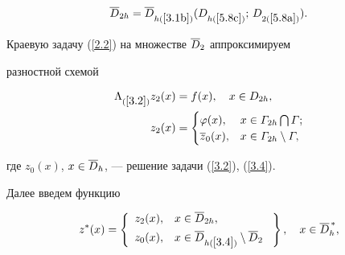 \begin{equation} \label{5.8d}


\Db_{2h}=\Db_{h(\ref{3.1b})}(D_{h(\ref{5.8c})}; \,


D_{2(\ref{5.8a})}).


\end{equation}





Краевую задачу (\ref{2.2}) на множестве $\overline{D}_2$ аппроксимируем


разностной схемой


\begin{equation} \label{5.8e}


\begin{split}


\La_{(\ref{3.2})} z_2(x) &= f(x), \quad 


x\in D_{2h}, \\


z_2(x)&=


\begin{cases}


\vf(x), & x\in \G_{2h}\bigcap \G;\\


\ovl{z}_0(x), & x\in \G_{2h}\setminus \G,


\end{cases}


\end{split}


\end{equation}


где $z_0(x)$, $x\in\overline{D}_h$, --- решение задачи (\ref{3.2}), (\ref{3.4}).





Далее введем функцию


\begin{equation} \label{5.8f}


z^*(x)= \left\{


\begin{array}{ll}


z_2(x), & x\in \Db_{2h},\\[1ex]


z_0(x), & x\in \Db_{h(\ref{3.4})}\setminus \Db_2 \


\end{array} \right\}, \quad x\in \Dbh^{\,*},


\end{equation}


\eeqs



